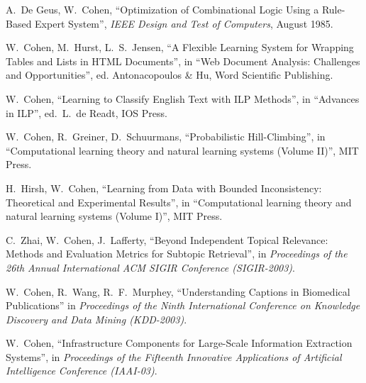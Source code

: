 \item[1985]	A.~De Geus, W.~Cohen, ``Optimization of
		Combinational Logic Using a Rule-Based Expert
		System'', {\em IEEE Design and Test of Computers},
		August 1985.
\ed

\bd
\item[2003] W.~Cohen, M.~Hurst, L.~S.~Jensen, 
	``A Flexible Learning System for Wrapping Tables and Lists in HTML Documents'', 
	in ``Web Document Analysis: Challenges and Opportunities'', ed. Antonacopoulos \& Hu, 
	Word Scientific Publishing.

\item[1996] W.~Cohen, ``Learning to Classify English Text with 
	ILP Methods'', in ``Advances in ILP'',
	ed.~L.~de Readt, IOS Press. 

\item[1994] W.~Cohen, R.~Greiner, D.~Schuurmans,
	``Probabilistic Hill-Climbing'',
	in ``Computational learning theory and
	natural learning systems (Volume II)'', MIT Press.

\item[1994] H.~Hirsh, W.~Cohen, ``Learning from Data with Bounded 
	Inconsistency: Theoretical and Experimental Results'', 
	in ``Computational learning theory and natural learning
	systems (Volume I)'', MIT Press.


\ed

\bd
\item[2003] C.~Zhai, W.~Cohen, J.~Lafferty,
	``Beyond Independent Topical Relevance: Methods and Evaluation Metrics for Subtopic Retrieval'',
	in {\it Proceedings of the 26th Annual International ACM SIGIR Conference (SIGIR-2003)}.

\item[2003] W.~Cohen, R.~Wang, R.~F.~Murphey,
	``Understanding Captions in Biomedical Publications''
	in {\em Proceedings of the Ninth International Conference on Knowledge Discovery and
	Data Mining (KDD-2003)}.

\item[2003] W.~Cohen,
	``Infrastructure Components for Large-Scale Information Extraction
	Systems'', in {\em Proceedings of the 
	Fifteenth Innovative Applications of Artificial 
	Intelligence Conference (IAAI-03)}.

